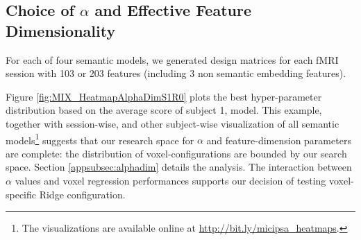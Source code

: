 \subsection{Choice of \(\alpha\) and Effective Feature Dimensionality}


For each of four semantic models, we generated design matrices for each fMRI session with 103 or 203 features (including 3 non semantic embedding features). 

Figure \ref{fig:MIX_HeatmapAlphaDimS1R0} plots the best hyper-parameter distribution based on the average  score of subject 1,  model. This example, together with session-wise, and other subject-wise visualization of all semantic models\footnote{The visualizations are available online at \url{http://bit.ly/micipsa_heatmaps}.} suggests that our research space for \(\alpha\) and feature-dimension parameters are complete: the distribution of voxel-configurations are bounded by our search space. Section \ref{appsubsec:alphadim} details the analysis. The interaction between \(\alpha\) values and voxel regression performances supports our decision of testing voxel-specific Ridge configuration.

